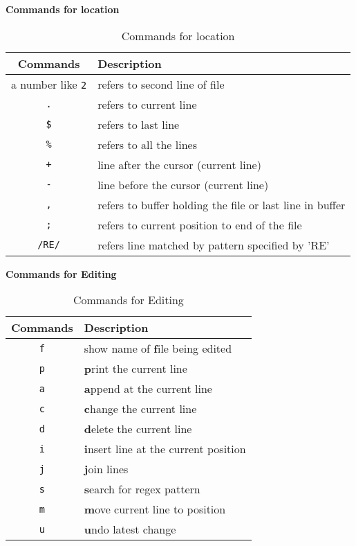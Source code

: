 \textbf{Commands for location}

\begin{table}[h!]
  \caption{Commands for location}
\begin{tabular}{ c l }
\toprule
Commands & Description \\
\midrule
a number like \texttt{2} & refers to second line of file \\
\texttt{.} & refers to current line \\
\texttt{\$} & refers to last line \\
\texttt{\%} & refers to all the lines \\
\texttt{+} & line after the cursor (current line) \\
\texttt{-} & line before the cursor (current line) \\
\texttt{,} & refers to buffer holding the file or last line in buffer \\
\texttt{;} & refers to current position to end of the file \\
\texttt{/RE/} & refers line matched by pattern specified by 'RE' \\
\bottomrule
\end{tabular}
\end{table}


\textbf{Commands for Editing}

\begin{table}[h!]
  \caption{Commands for Editing}
  \begin{tabular}{ c l }
    \toprule
    Commands & Description \\
    \midrule
    \texttt{f} & show name of \textbf{f}ile being edited \\
    \texttt{p} & \textbf{p}rint the current line \\
    \texttt{a} & \textbf{a}ppend at the current line \\
    \texttt{c} & \textbf{c}hange the current line \\
    \texttt{d} & \textbf{d}elete the current line \\
    \texttt{i} & \textbf{i}nsert line at the current position \\
    \texttt{j} & \textbf{j}oin lines \\
    \texttt{s} & \textbf{s}earch for regex pattern \\
    \texttt{m} & \textbf{m}ove current line to position \\
    \texttt{u} & \textbf{u}ndo latest change \\
    \bottomrule
  \end{tabular}
\end{table}

